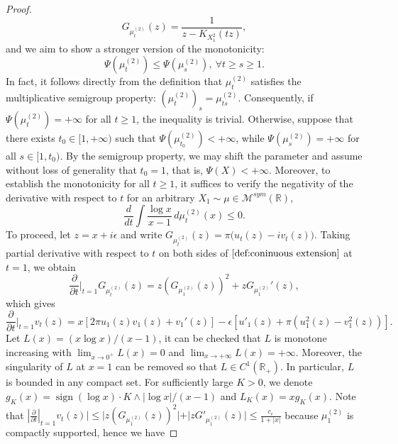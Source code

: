 \documentclass[10pt, reqno]{amsart}
\numberwithin{equation}{section}
\theoremstyle{definition}
\theoremstyle{plain}
\theoremstyle{remark}
\newcommand{\R}{\mathbb{R}}
\newcommand{\1}{\mathbbm{1}}
\newcommand{\probmsymr}{\mathcal{M}^{sym}(\R)}
\begin{document}
\begin{proof}
        \begin{equation}\label{def:coninuous extension}
            G_{\mu^{(2)}_t}(z)=\frac{1}{z-K_{X_1^2}(tz)},
        \end{equation}
        and we aim to show a stronger version of the monotonicity:
        \begin{equation}\label{ineq:monofisher real}
            \Psi(\mu^{(2)}_t)\le \Psi(\mu^{(2)}_s),\ \forall t\ge s\ge 1.
        \end{equation}
        In fact, it follows directly from the definition that $\mu^{(2)}_t$ 
        satisfies the multiplicative semigroup property: $(\mu^{(2)}_t)_s = \mu^{(2)}_{ts}$. Consequently, if $\Psi(\mu^{(2)}_t)=+\infty$ for all $t \ge 1$, the inequality is trivial. Otherwise, suppose that there exists $t_0 \in [1,+\infty)$ such that $\Psi(\mu^{(2)}_{t_0}) < +\infty$, while $\Psi(\mu^{(2)}_{s}) = +\infty$ for all $s \in [1,t_0)$. By the semigroup property, we may shift the parameter and assume without loss of generality that $t_0 = 1$, that is, $\Psi(X) < +\infty$. Moreover, to establish the monotonicity for all $t \ge 1$, it suffices to verify the negativity of the derivative with respect to $t$ for an arbitrary $X_1 \sim \mu \in \probmsymr$,
        \begin{equation*}
            \frac{d}{d t} \int \frac{\log x}{x-1}\,d\mu^{(2)}_t(x)\le 0.
        \end{equation*}
        To proceed, let $z=x+i\epsilon$ and write $G_{\mu^{(2)}_t}(z)=\pi\bigl(u_t(z)-iv_t(z)\bigr)$. Taking partial derivative with respect to $t$ on both sides of $\eqref{def:coninuous extension}$ at $t=1$, we obtain
        \begin{equation*}
            \frac{\partial}{\partial t}\Big|_{t=1}G_{\mu^{(2)}_t}(z) = z(G_{\mu^{(2)}_1}(z))^2+zG_{\mu^{(2)}_1}'(z),
        \end{equation*}
        which gives
        \begin{equation*}
            \frac{\partial}{\partial t}\Big|_{t=1}v_t(z) = x[2\pi u_1(z)v_1(z)+v_1'(z)] -\epsilon[u'_1(z)+\pi(u_1^2(z)-v_1^2(z))].
        \end{equation*}
        Let $L(x)=(x\log x)/(x-1)$, it can be checked that $L$ is monotone increasing with $\lim_{x\to 0^+}L(x)=0$ and $\lim_{x\to +\infty}L(x)=+\infty$. Moreover, the singularity of $L$ at $x=1$ can be removed so that $L\in C^1(\R_+)$. In particular, $L$ is bounded in any compact set. For sufficiently large $K>0$, we denote $g_K(x)=\operatorname{sign}(\log x) \cdot K\wedge|\log x|/(x-1)$ and $L_K(x)=xg_K(x)$. Note that $|\frac{\partial}{\partial t}|_{t=1}v_t(z)|\le |z(G_{\mu_1^{(2)}}(z))^2|+|zG'_{\mu_1^{(2)}}(z)|\le \frac{c_\epsilon}{1+|x|}$ because $\mu^{(2)}_1$ is compactly supported, hence we have

\end{proof}
\end{document}

